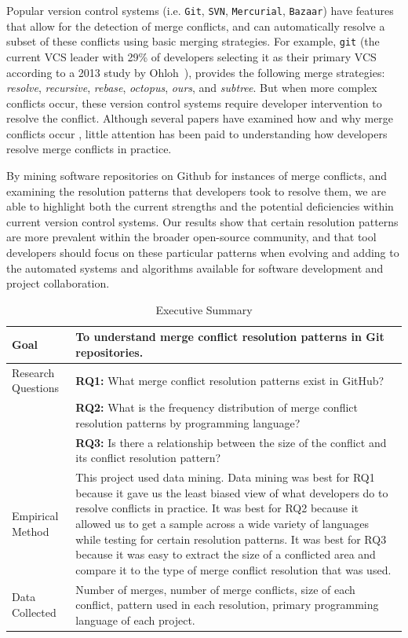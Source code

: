 \documentclass{sig-alternate-05-2015}
\begin{document}
Popular version control systems (i.e. \texttt{Git}, \texttt{SVN}, \texttt{Mercurial}, \texttt{Bazaar}) have features that allow for the detection of merge conflicts, and can automatically resolve a subset of these conflicts using basic merging strategies. For example, \texttt{git} (the current VCS leader with 29\% of developers selecting it as their primary VCS according to a 2013 study by Ohloh~\cite{German16}), provides the following merge strategies: \textit{resolve}, \textit{recursive}, \textit{rebase}, \textit{octopus}, \textit{ours}, and \textit{subtree}. But when more complex conflicts occur, these version control systems require developer intervention to resolve the conflict. Although several papers have examined how and why merge conflicts occur \cite{brun10}\cite{Sarma08}\cite{Guimaraes12}, little attention has been paid to understanding how developers resolve merge conflicts in practice.

By mining software repositories on Github for instances of merge conflicts, and examining the resolution patterns that developers took to resolve them, we are able to highlight both the current strengths and the potential deficiencies within current version control systems. Our results show that certain resolution patterns are more prevalent within the broader open-source community, and that tool developers should focus on these particular patterns when evolving and adding to the automated systems and algorithms available for software development and project collaboration.

\begin{table}
\centering
\caption{Executive Summary}
\begin{tabular}{| l | p{10cm} | } \hline
Goal & To understand merge conflict resolution patterns in Git repositories. \\ \hline
Research Questions  & \textbf{RQ1:} What merge conflict resolution patterns exist in GitHub?\\
& \textbf{RQ2:} What is the frequency distribution of merge conflict resolution patterns by programming language?\\
& \textbf{RQ3:} Is there a relationship between the size of the conflict and its conflict resolution pattern?\\ \hline
Empirical Method & This project used data mining. Data mining was best for RQ1 because it gave us the least biased view of what developers do to resolve conflicts in practice. It was best for RQ2 because it allowed us to get a sample across a wide variety of languages while testing for certain resolution patterns. It was best for RQ3 because it was easy to extract the size of a conflicted area and compare it to the type of merge conflict resolution that was used.\\ \hline
Data Collected & Number of merges, number of merge conflicts, size of each conflict, pattern used in each resolution, primary programming language of each project.\\
\hline\end{tabular}
\label{table:t1}
\end{table}
\end{document}
